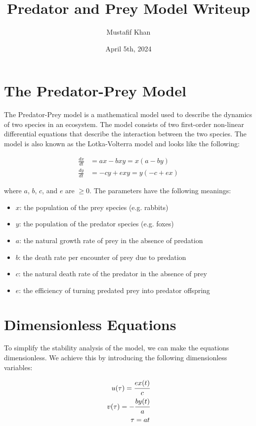\documentclass[11pt, letterpaper]{article}
\title{Predator and Prey Model Writeup}
\author{Mustafif Khan}
\date{April 5th, 2024}
\begin{document}
\maketitle
\newpage
\tableofcontents
\newpage
{}
\section{The Predator-Prey Model}
The Predator-Prey model is a mathematical model used to describe the
dynamics of two species in an ecosystem. The model consists of two first-order
non-linear differential equations that describe the interaction between the two
species. The model is also known as the Lotka-Volterra model and looks like the
following:

\begin{align}
    \frac{dx}{dt} & = ax - bxy = x(a-by)     \\
    \frac{dy}{dt} & = -cy + exy = y(-c + ex)
\end{align}

where $a$, $b$, $c$, and $e$ are $\geq 0$. The parameters have the
following meanings:

\begin{itemize}
    \item $x$: the population of the prey species (e.g. rabbits)
    \item $y$: the population of the predator species (e.g. foxes)
    \item $a$: the natural growth rate of prey in the absence of predation
    \item $b$: the death rate per encounter of prey due to predation
    \item $c$: the natural death rate of the predator in the absence of
          prey
    \item $e$: the efficiency of turning predated prey into predator
          offspring
\end{itemize}

\section{Dimensionless Equations}
To simplify the stability analysis of the model, we can make the equations
dimensionless. We achieve this by introducing the following dimensionless
variables:

\begin{align*}
    u (\tau) = \cfrac{ex(t)}{c}  \\
    v (\tau) = -\cfrac{by(t)}{a} \\
    \tau = at
\end{align*}
\end{document}
